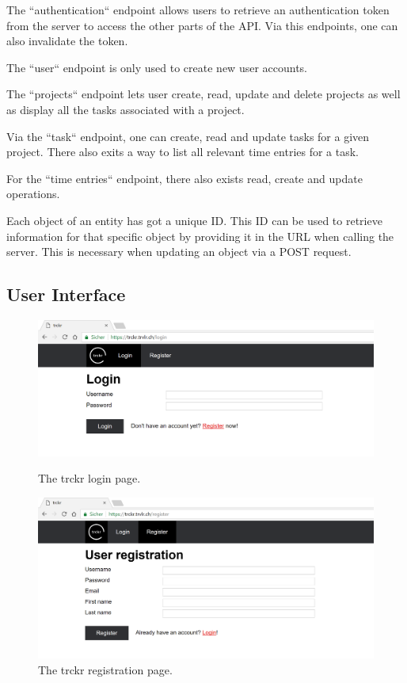 \documentclass[a4paper, 12pt, headsepline]{scrartcl}
\begin{document}
The ``authentication`` endpoint allows users to retrieve an authentication token
from the server to access the other parts of the API. Via this endpoints, one
can also invalidate the token.

The ``user`` endpoint is only used to create new user accounts.

The ``projects`` endpoint lets user create, read, update and delete projects as
well as display all the tasks associated with a project.

Via the ``task`` endpoint, one can create, read and update tasks for a given project.
There also exits a way to list all relevant time entries for a task.

For the ``time entries`` endpoint, there also exists read, create and update operations.

Each object of an entity has got a unique ID. This ID can be used to retrieve
information for that specific object by providing it in the URL when calling the
server. This is necessary when updating an object via a POST request.


\subsection{User Interface}

\begin{figure}[h]
    \includegraphics[width=\textwidth]{trckr-login}
    \caption{The trckr login page.}
    \label{fig:trckr-login}

    \includegraphics[width=\textwidth]{trckr-register}
    \caption{The trckr registration page.}
    \label{fig:trckr-register}
\end{figure}
\end{document}
